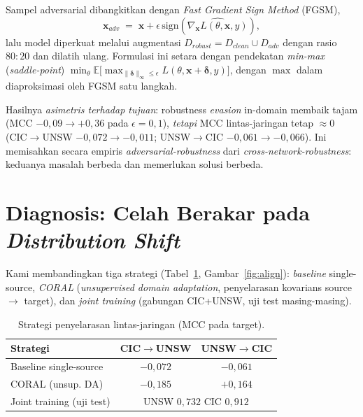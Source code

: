 \documentclass[11pt,a4paper]{article}
\begin{document}
Sampel adversarial dibangkitkan dengan \emph{Fast Gradient Sign Method} (FGSM),
\begin{equation}
\label{eq:fgsm}
\mathbf{x}_{adv} \;=\; \mathbf{x} + \epsilon\,\mathrm{sign}\!\left(\widehat{\nabla_{\mathbf{x}} L(\theta,\mathbf{x},y)}\right),
\end{equation}
lalu model diperkuat melalui augmentasi $D_{robust}=D_{clean}\cup D_{adv}$ dengan
rasio $80{:}20$ dan dilatih ulang. Formulasi ini setara dengan pendekatan
\emph{min-max} (\emph{saddle-point}) $\min_\theta \mathbb{E}\bigl[\max_{\|\boldsymbol{\delta}\|_\infty \le \epsilon} L(\theta,\mathbf{x}+\boldsymbol{\delta},y)\bigr]$,
dengan $\max$ dalam diaproksimasi oleh FGSM satu langkah.

Hasilnya \emph{asimetris terhadap tujuan}: robustness \emph{evasion} in-domain
membaik tajam (MCC $-0{,}09 \rightarrow +0{,}36$ pada $\epsilon=0{,}1$),
\emph{tetapi} MCC lintas-jaringan tetap $\approx 0$ (CIC$\rightarrow$UNSW
$-0{,}072 \rightarrow -0{,}011$; UNSW$\rightarrow$CIC $-0{,}061 \rightarrow
-0{,}066$). Ini memisahkan secara empiris \emph{adversarial-robustness} dari
\emph{cross-network-robustness}: keduanya masalah berbeda dan memerlukan solusi
berbeda.
\fi

\section{Diagnosis: Celah Berakar pada \emph{Distribution Shift}}
\label{sec:align}

Kami membandingkan tiga strategi (Tabel~\ref{tab:align},
Gambar~\ref{fig:align}): \emph{baseline} single-source, \emph{CORAL}
(\emph{unsupervised domain adaptation}, penyelarasan kovarians source$\rightarrow$
target), dan \emph{joint training} (gabungan CIC+UNSW, uji test masing-masing).

\begin{table}[h]
\centering
\caption{Strategi penyelarasan lintas-jaringan (MCC pada target).}
\label{tab:align}
\begin{tabular}{lcc}
\toprule
Strategi & CIC$\rightarrow$UNSW & UNSW$\rightarrow$CIC \\
\midrule
Baseline single-source & $-0{,}072$ & $-0{,}061$ \\
CORAL (unsup. DA)      & $-0{,}185$ & $+0{,}164$ \\
Joint training (uji test) & \multicolumn{2}{c}{UNSW $0{,}732$ \quad CIC $0{,}912$} \\
\bottomrule
\end{tabular}
\end{table}
\end{document}
